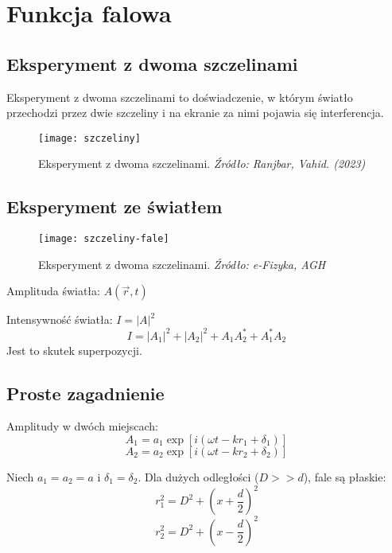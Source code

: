 \section{Funkcja falowa}

\subsection{Eksperyment z dwoma szczelinami}
Eksperyment z dwoma szczelinami to doświadczenie, w którym światło przechodzi przez dwie szczeliny i na ekranie za nimi pojawia się interferencja.

\begin{figure}[H]
    \centering
    \texttt{[image: szczeliny]}
    \caption{Eksperyment z dwoma szczelinami. \textit{Źródło: Ranjbar, Vahid. (2023)}}
    \label{fig:szczeliny}
\end{figure}

\subsection{Eksperyment ze światłem}

\begin{figure}[H]
    \centering
    \texttt{[image: szczeliny-fale]}
    \caption{Eksperyment z dwoma szczelinami. \textit{Źródło: e-Fizyka, AGH}}
    \label{fig:szczeliny-fale}
\end{figure}

Amplituda światła: $A(\vec{r}, t)$

Intensywność światła: $I = |A|^2$
\begin{equation*}
    I = |A_1|^2 + |A_2|^2 + A_1 A_2^* + A_1^* A_2
\end{equation*}
Jest to skutek superpozycji.

\subsection{Proste zagadnienie}

Amplitudy w dwóch miejscach:
\begin{equation*}
    A_1 = a_1 \exp[i(\omega t - k r_1 + \delta_1)]
\end{equation*}
\begin{equation*}
    A_2 = a_2 \exp[i(\omega t - k r_2 + \delta_2)]
\end{equation*}

Niech $a_1 = a_2 = a$ i $\delta_1 = \delta_2$. Dla dużych odległości ($D >> d$), fale są płaskie:
\begin{equation*}
    r_1^2 = D^2 + \left(x + \frac{d}{2} \right)^2
\end{equation*}
\begin{equation*}
    r_2^2 = D^2 + \left(x - \frac{d}{2} \right)^2
\end{equation*}

